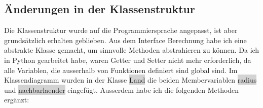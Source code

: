 \documentclass[a4paper,11pt]{article}
\begin{document}
{\subsection{\"Anderungen in der Klassenstruktur}

Die Klassenstruktur wurde auf die Programmiersprache angepasst, ist aber grunds\"atzlich erhalten geblieben. Aus dem Interface Berechnung habe ich eine abstrakte Klasse gemacht, um sinnvolle Methoden abstrahieren zu k\"onnen. Da ich in Python gearbeitet habe, waren Getter und Setter nicht mehr erforderlich, da alle Variablen, die ausserhalb von Funktionen definiert sind global sind.
Im Klassendiagramm wurden in der Klasse \colorbox{lightgray}{Land} die beiden Membervariablen \colorbox{lightgray}{radius} und \colorbox{lightgray}{nachbarlaender} eingef\"ugt.
Ausserdem habe ich die folgenden Methoden erg\"anzt:

}
\end{document}
